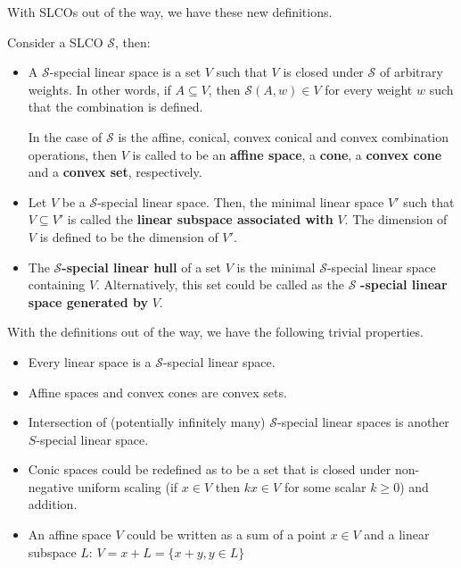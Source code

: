 With SLCOs out of the way, we have these new definitions.

\begin{definition}
  Consider a SLCO \( \mathcal{S} \), then:
  \begin{itemize}
    \item A \( \mathcal{S} \)-special linear space is a set \( V \) such that \( V \) is
      closed under \( \mathcal{S} \) of arbitrary weights. In other words, if \(
      A \subseteq V \), then \( \mathcal{S}(A, w) \in V \) for every weight \( w
      \) such that the combination is defined.

      In the case of \( \mathcal{S} \) is the affine, conical, convex conical
      and convex combination operations, then \( V \) is called to be an
      \textbf{affine space}, a \textbf{cone}, a \textbf{convex cone} and a
      \textbf{convex set}, respectively.

    \item Let \( V \) be a \( \mathcal{S} \)-special linear space. Then, the
      minimal linear space \( V' \) such that \( V \subseteq V' \) is called the
      \textbf{linear subspace associated with} \( V \). The dimension of \( V \)
      is defined to be the dimension of \( V' \).

    \item The \( \mathcal{S} \)\textbf{-special linear hull} of a set \( V \) is the
      minimal \( \mathcal{S} \)-special linear space containing \( V \).
      Alternatively, this set could be called as the \( \mathcal{S} \)
      \textbf{-special linear space generated by} \( V \).
\end{itemize}
\end{definition}

With the definitions out of the way, we have the following trivial properties.

\begin{itemize}
  \item Every linear space is a \( \mathcal{S} \)-special linear space.
  \item Affine spaces and convex cones are convex sets.
  \item Intersection of (potentially infinitely many) \( \mathcal{S} \)-special
    linear spaces is another \( S \)-special linear space.
  \item Conic spaces could be redefined as to be a set that is  closed under
    non-negative uniform scaling (if \( x \in
    V\) then \( kx \in V \) for some scalar \( k \ge 0 \)) and addition.
  \item An affine space \( V \) could be written as a sum of a point \( x \in V \)
    and a linear subspace \( L \): \( V = x + L = \{x + y, y \in L\}   \)
\end{itemize}

